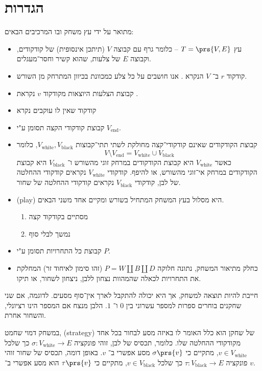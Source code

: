 \documentclass[a4paper,10pt,twoside,openany]{book}
\begin{document}
\section{הגדרות}

\begin{definition}
מתואר על ידי עץ משחק ובו המרכיבים הבאים:
\begin{itemize}
\item עץ
$T = \prs{V,E}$ –
כלומר גרף עם קבוצה
$V$
(תיתכן אינסופית) של קודקודים, וקבוצה
$E$
של צלעות, שהוא קשיר וחסר־מעגלים.
\item קודקוד $r$
ב־%
$V$
הנקרא
.
אנו חושבים על כל צלע כמכוונת בכיוון המתרחק מן השורש.
\item קבוצת הצלעות היוצאות מקודקוד
$v$
נקראת
.
\item
קודקוד שאין לו עוקבים נקרא
\item
קבוצת קודקודי הקצה תסומן ע"י
$V_{\text{end}}$.
\item
קבוצת הקודקודים שאינם קודקודי־קצה מחולקת לשתי תתי־קבוצות
$V_{\text{white}}, V_{\text{black}}$,
כלומר
\[V \setminus V_{\text{end}} = V_{\text{white}} \cup V_{\text{black}}\]
כאשר
$V_{\text{white}}$
היא קבוצת הקודקודים במרחק זוגי מהשורש ו־%
$V_{\text{black}}$
היא קבוצת הקודקודים במרחק אי־זוגי מהשורש, או להיפף.
קודקודי
$V_{\text{white}}$
נקראים קודקודי ההחלטה של לבן, קודקודי
$V_{\text{black}}$
נקראים קודקודי ההחלטה של שחור.
\item {} (\textenglish{play})
היא מסלול בעץ המשחק המתחיל בשורש ומקיים אחד משני הבאים.
\begin{enumerate}[label = \alph*.]
\item מסתיים בקודקוד קצה
\item נמשך לבלי סוף
\end{enumerate}
\item קבוצת כל התחרויות תסומן ע"י
$P$.
\item כחלק מתיאור המשחק, נתונה חלוקה
$P = W \amalg B \amalg D$
(זהו סימון לאיחוד זר)
המחלקת את התחרויות לכאלה שהמהוות נצחון ללבן, ניצחון לשחור, או תיקו.
\end{itemize}
\end{definition}
\begin{remark}
חייבת להיות תוצאה למשחק, אך היא יכולה להתקבל לארך אין־סוף מסעים.
לדוגמה, אם שני שחקנים בוחרים ספרות למספר עשרוני בין
$0$
ו־%
$1$.
הלבן מנצח אם המספר הינו רציונלי, והשחור אחרת.
\end{remark}
\begin{definition}
במשחק דמוי שחמט,
 (\textenglish{strategy})
של שחקן הוא כלל האומר לו באיזה מסע לבחור בכל אחד מקודקודי ההחלטה שלו.
כלומר, תכסיס של לבן, זוהי פונקציה
$\sigma \colon V_{\text{white}} \to E$
כך שלכל
$v \in V_{\text{white}}$,
מתקיים כי
$\sigma\prs{v}$
מסע אפשרי ב־%
$v$.
באופן דומה, תכסיס של שחור זוהי פונקציה
$\tau \colon V_{\text{black}} \to E$
כך שלכל
$v \in V_{\text{black}}$,
מתקיים כי
$\tau\prs{v}$
הוא מסע אפשרי ב־%
$v$.
\end{definition}
\end{document}
